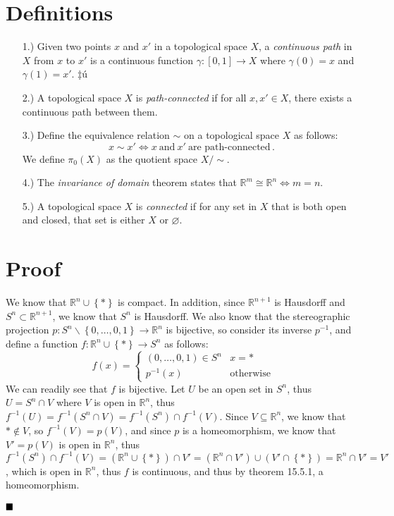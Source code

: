 \documentclass[12pt]{article}
\newcommand{\done}{
    \ensuremath{\strut\hfill\blacksquare}
}
\newcommand{\braces}[1]{\left\{#1\right\}}           %
\newcommand{\parens}[1]{\left(#1\right)}             %
\newcommand{\R}{\mathbb{R}}
\begin{document}
\linespread{1.2}

\setlength{\parskip}{0.2in}

\pagestyle{fancy}

\normalsize

\section*{Definitions}
\begin{itemize}
    \item [1.)] Given two points $x$ and $x'$ in a topological space $X$, a
    \textit{continuous path} in $X$ from $x$ to $x'$ is a continuous function
    $\gamma : [0,1] \to X$ where $\gamma(0) = x$ and $\gamma(1) = x'$.
    ‡{ú}
    \item [2.)] A topological space $X$ is \textit{path-connected} if for all
    $x,x' \in X$, there exists a continuous path between them.

    \item [3.)] Define the equivalence relation $\sim$ on a topological space
    $X$ as follows:
    \[ x \sim x' \iff x\ \text{and}\ x'\ \text{are path-connected} \, . \]
    We define $\pi_0(X)$ as the quotient space $X/{\sim}$.

    \item [4.)] The \textit{invariance of domain} theorem states that
    $\R^m \cong \R^n \iff m = n$.

    \item [5.)] A topological space $X$ is \textit{connected} if for any set in
    $X$ that is both open and closed, that set is either $X$ or $\varnothing$.
\end{itemize}

\section*{Proof}

We know that $\R^n \cup \braces{*}$ is compact. In addition, since
$\R^{n + 1}$ is Hausdorff and $S^n \subset \R^{n + 1}$, we know that $S^n$ is
Hausdorff. We also know that the stereographic projection
$p : S^n \backslash \braces{0, \dots, 0, 1} \to \R^n$ is bijective, so
consider its inverse $p^{-1}$, and define a function
$f : \R^{n} \cup \braces{*} \to S^n$ as follows:
\[
    f(x) = \begin{cases}
        (0, \dots, 0, 1) \in S^n & x = * \\
        p^{-1}(x) & \text{otherwise}
    \end{cases}
\]
We can readily see that $f$ is bijective. Let $U$ be an open set in $S^n$, thus
$U = S^n \cap V$ where $V$ is open in $\R^n$, thus
$f^{-1}(U) = f^{-1}(S^n \cap V) = f^{-1}(S^n) \cap f^{-1}(V)$. Since
$V \subseteq \R^n$, we know that $* \notin V$, so $f^{-1}(V) = p(V)$, and since
$p$ is a homeomorphism, we know that $V' = p(V)$ is open in $\R^n$, thus
$f^{-1}(S^n) \cap f^{-1}(V) = \parens{\R^n \cup \braces{*}} \cap V'
    = (\R^n \cap V') \cup (V' \cap \braces{*}) = \R^n \cap V' = V'$, which is
open in $\R^n$, thus $f$ is continuous, and thus by theorem 15.5.1, a
homeomorphism.
\done
\end{document}
